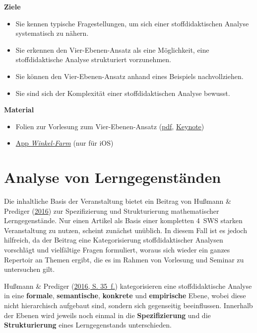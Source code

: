 \documentclass[
]{scrbook}
\providecommand{\tightlist}{%
  \setlength{\itemsep}{0pt}\setlength{\parskip}{0pt}}
\renewenvironment{quote}{
  \list{}{
	\leftmargin0.2cm   %
    \rightmargin\leftmargin
      	\def\FrameCommand
    {%
        {\color{quoteColor}\vrule width 2pt}%
        \hspace{0pt}%
    }%
    \MakeFramed{\advance \hsize -\width \FrameRestore}    \color{quoteColor}
    }
  \item\relax
}
{\endlist\color{black}\endMakeFramed}
\theoremstyle{definition}
\theoremstyle{definition}
\theoremstyle{definition}
\theoremstyle{definition}
\theoremstyle{remark}
\begin{document}
\begin{quote}
\textbf{Ziele}

\begin{itemize}
\tightlist
\item
  Sie kennen typische Fragestellungen, um sich einer stoffdidaktischen Analyse systematisch zu nähern.
\item
  Sie erkennen den Vier-Ebenen-Ansatz als eine Möglichkeit, eine stoffdidaktische Analyse strukturiert vorzunehmen.
\item
  Sie können den Vier-Ebenen-Ansatz anhand eines Beispiels nachvollziehen.
\item
  Sie sind sich der Komplexität einer stoffdidaktischen Analyse bewusst.
\end{itemize}

\textbf{Material}

\begin{itemize}
\tightlist
\item
  Folien zur Vorlesung zum Vier-Ebenen-Ansatz (\href{files/Stoffdidaktik-WiSe2223-Kap1.pdf}{pdf}, \href{files/Stoffdidaktik-WiSe2223-Kap1.key}{Keynote})
\item
  \href{https://apps.apple.com/de/app/winkel-farm/id1369585218}{App \emph{Winkel-Farm}} (nur für iOS)
\end{itemize}
\end{quote}

\hypertarget{analyse-von-lerngegenstuxe4nden}{%
\section{Analyse von Lerngegenständen}\label{analyse-von-lerngegenstuxe4nden}}

Die inhaltliche Basis der Veranstaltung bietet ein Beitrag von Hußmann \& Prediger (\protect\hyperlink{ref-Hussmann:2016}{2016}) zur Spezifizierung und Strukturierung mathematischer Lerngegenstände. Nur einen Artikel als Basis einer kompletten 4~SWS starken Veranstaltung zu nutzen, scheint zunächst unüblich. In diesem Fall ist es jedoch hilfreich, da der Beitrag eine Kategorisierung stoffdidaktischer Analysen vorschlägt und vielfältige Fragen formuliert, woraus sich wieder ein ganzes Repertoir an Themen ergibt, die es im Rahmen von Vorlesung und Seminar zu untersuchen gilt.

Hußmann \& Prediger (\protect\hyperlink{ref-Hussmann:2016}{2016, S. 35~f.}) kategorisieren eine stoffdidaktische Analyse in eine \textbf{\textcolor{formalColor}{formale}}, \textbf{\textcolor{semanticColor}{semantische}}, \textbf{\textcolor{concreteColor}{konkrete}} und \textbf{\textcolor{empiricColor}{empirische}} Ebene, wobei diese nicht hierarchisch aufgebaut sind, sondern sich gegenseitig beeinflussen. Innerhalb der Ebenen wird jeweils noch einmal in die \textbf{Spezifizierung} und die \textbf{Strukturierung} eines Lerngegenstands unterschieden.
\end{document}
